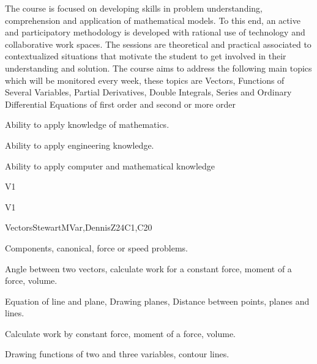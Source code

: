 \begin{syllabus}


\begin{justification}
  The course is focused on developing skills in problem understanding, comprehension and application of mathematical models. To this end, an active and participatory methodology is developed with rational use of technology and collaborative work spaces. The sessions are theoretical and practical associated to contextualized situations that motivate the student to get involved in their understanding and solution.
  The course aims to address the following main topics which will be monitored every week, these topics are Vectors, Functions of Several Variables, Partial Derivatives, Double Integrals, Series and Ordinary Differential Equations of first order and second or more order
\end{justification}

\begin{goals}
  \item Ability to apply knowledge of mathematics.
  \item Ability to apply engineering knowledge.
  \item Ability to apply computer and mathematical knowledge
\end{goals}

\begin{outcomes}{V1}
    \item {}  
    \item {}
\end{outcomes}

\begin{competences}{V1}
    \item {}
    \item {}
\end{competences}

\begin{unit}{Vectors}{}{StewartMVar,DennisZ}{24}{C1,C20}
   \begin{topics}      
    \item Components, canonical, force or speed problems.
    \item Angle between two vectors, calculate work for a constant force, moment of a force, volume.
    \item Equation of line and plane, Drawing planes, Distance between points, planes and lines.
    \item Calculate work by constant force, moment of a force, volume.
    \item Drawing functions of two and three variables, contour lines.
  \end{topics}


\end{unit}
\end{syllabus}
